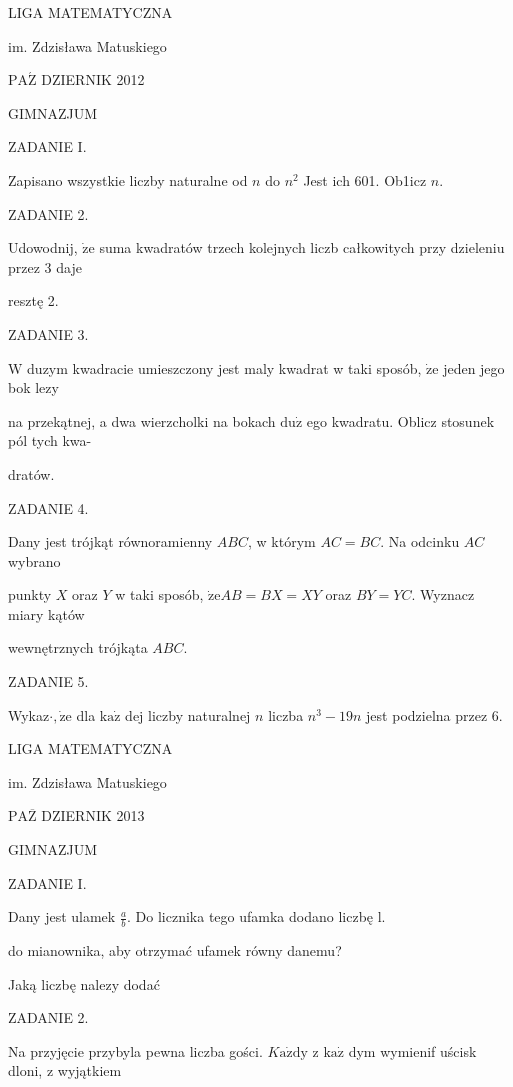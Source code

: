 \documentclass[a4paper,12pt]{article}
\begin{document}
LIGA MATEMATYCZNA

im. Zdzisława Matuskiego

$\mathrm{P}\mathrm{A}\acute{\mathrm{Z}}$ DZIERNIK 2012

GIMNAZJUM

ZADANIE I.

Zapisano wszystkie liczby naturalne od $n$ do $n^{2}$ Jest ich 601. Ob1icz $n.$

ZADANIE 2.

Udowodnij, $\dot{\mathrm{z}}\mathrm{e}$ suma kwadratów trzech kolejnych liczb całkowitych przy dzieleniu przez 3 daje

resztę 2.

ZADANIE 3.

$\mathrm{W}$ duzym kwadracie umieszczony jest maly kwadrat w taki sposób, $\dot{\mathrm{z}}\mathrm{e}$ jeden jego bok lezy

na przekątnej, a dwa wierzcholki na bokach $\mathrm{d}\mathrm{u}\dot{\mathrm{z}}$ ego kwadratu. Oblicz stosunek pól tych kwa-

dratów.

ZADANIE 4.

Dany jest trójkąt równoramienny $ABC$, w którym $AC = BC$. Na odcinku $AC$ wybrano

punkty $X$ oraz $Y$ w taki sposób, $\dot{\mathrm{z}}\mathrm{e}AB=BX=XY$ oraz $BY=YC$. Wyznacz miary kątów

wewnętrznych trójkąta $ABC.$

ZADANIE 5.

Wykaz$\cdot, \dot{\mathrm{z}}\mathrm{e}$ dla $\mathrm{k}\mathrm{a}\dot{\mathrm{z}}$ dej liczby naturalnej $n$ liczba $n^{3}-19n$ jest podzielna przez 6.






LIGA MATEMATYCZNA

im. Zdzisława Matuskiego

$\mathrm{P}\mathrm{A}\overline{\mathrm{Z}}$ DZIERNIK 2013

GIMNAZJUM

ZADANIE I.

Dany jest ulamek $\displaystyle \frac{a}{b}$. Do licznika tego ufamka dodano liczbę l.

do mianownika, aby otrzymać ufamek równy danemu?

Jaką liczbę nalezy dodać

ZADANIE 2.

Na przyjęcie przybyla pewna liczba gości. $K\mathrm{a}\dot{\mathrm{z}}\mathrm{d}\mathrm{y}$ z $\mathrm{k}\mathrm{a}\dot{\mathrm{z}}$ dym wymienif uścisk dloni, z wyjątkiem
\end{document}
